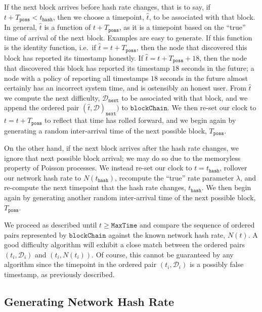 \documentclass[12pt,english]{mrl}
\theoremstyle{definition}
\renewcommand{\geq}{\geqslant}
\numberwithin{equation}{section}
\numberwithin{figure}{section}
\numberwithin{equation}{section}
\numberwithin{equation}{section}
\numberwithin{figure}{section}
\begin{document}
If the next block arrives before hash rate changes, that is to say, if $t + T_{\texttt{poss}} < t_{\texttt{hash}}$, then we choose a timepoint, $\hat{t}$, to be associated with that block. In general, $\hat{t}$ is a function of $t + T_{\texttt{poss}}$, as it is a timepoint based on the ``true'' time of arrival of the next block. Examples are easy to generate. If this function is the identity function, i.e.\ if $\hat{t} = t + T_{\texttt{poss}}$, then the node that discovered this block has reported its timestamp honestly. If $\hat{t} = t + T_{\texttt{poss}} + 18$, then the node that discovered this block has reported its timestamp $18$ seconds in the future; a node with a policy of reporting all timestamps $18$ seconds in the future almost certainly has an incorrect system time, and is ostensibly an honest user.  From $\hat{t}$ we compute the next difficulty, $\mathcal{D}_{\texttt{next}}$ to be associated with that block, and we append the ordered pair $(\hat{t},\mathcal{D})_{\texttt{next}})$ to $\texttt{blockChain}$. We then re-set our clock to $t = t + T_{\texttt{poss}}$ to reflect that time has rolled forward, and we begin again by generating a random inter-arrival time of the next possible block, $T_{\texttt{poss}}$.

On the other hand, if the next block arrives after the hash rate changes, we ignore that next possible block arrival; we may do so due to the memoryless property of Poisson processes. We instead re-set our clock to $t = t_{\texttt{hash}}$, rollover our network hash rate to $N(t_{\texttt{hash}})$, recompute the ``true'' rate parameter $\lambda$, and re-compute the next timepoint that the hash rate changes, $t_{\texttt{hash}}$. We then begin again by generating another random inter-arrival time of the next possible block, $T_{\texttt{poss}}$.

We proceed as described until $t \geq \texttt{MaxTime}$ and compare the sequence of ordered pairs represented by $\texttt{blockChain}$ against the known network hash rate, $N(t)$. A good difficulty algorithm will exhibit a close match between the ordered pairs $(t_i, \mathcal{D}_i)$ and $(t_i, N(t_i))$. Of course, this cannot be guaranteed by any algorithm since the timepoint in the ordered pair $(t_i, \mathcal{D}_i)$ is a possibly false timestamp, as previously described.

\subsection{Generating Network Hash Rate}\label{NetHashRate}
\end{document}
